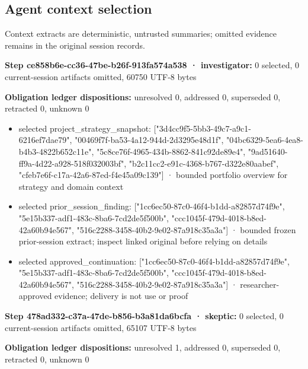 \documentclass[11pt]{article}
\begin{document}
\subsection{Agent context selection}
Context extracts are deterministic, untrusted summaries; omitted evidence remains in the original session records.\par
\textbf{Step ce858b6e-cc36-47be-b26f-913fa574a538 · investigator:} 0 selected, 0 current-session artifacts omitted, 60750 UTF-8 bytes\par
\textbf{Obligation ledger dispositions:} unresolved 0, addressed 0, superseded 0, retracted 0, unknown 0\par
\begin{itemize}
\item selected project\_strategy\_snapshot: ["3d4cc9f5-5bb3-49c7-a9c1-6216ef7dae79", "00469f7f-ba53-4a12-944d-2d3295e48d1f", "04bc6329-5ea6-4ea8-b4b3-4822b652c11e", "5c8ce76f-4965-434b-8862-841c92de89e4", "9ad51640-ff9a-4d22-a928-518f032003bf", "b2c11cc2-e91c-4368-b767-d322e80aabef", "cfeb7e6f-c17a-42a6-87ed-f4e45a09c139"] · bounded portfolio overview for strategy and domain context
\item selected prior\_session\_finding: ["1cc6ec50-87c0-46f4-b1dd-a82857d74f9e", "5e15b337-adf1-483c-8ba6-7cd2de5f500b", "ccc1045f-479d-4018-b8ed-42a60b94e567", "516c2288-3458-40b2-9e02-87a918c35a3a"] · bounded frozen prior-session extract; inspect linked original before relying on details
\item selected approved\_continuation: ["1cc6ec50-87c0-46f4-b1dd-a82857d74f9e", "5e15b337-adf1-483c-8ba6-7cd2de5f500b", "ccc1045f-479d-4018-b8ed-42a60b94e567", "516c2288-3458-40b2-9e02-87a918c35a3a"] · researcher-approved evidence; delivery is not use or proof
\end{itemize}
\textbf{Step 478ad332-c37a-47de-b856-b3a81da6bcfa · skeptic:} 0 selected, 0 current-session artifacts omitted, 65107 UTF-8 bytes\par
\textbf{Obligation ledger dispositions:} unresolved 1, addressed 0, superseded 0, retracted 0, unknown 0\par
\end{document}
